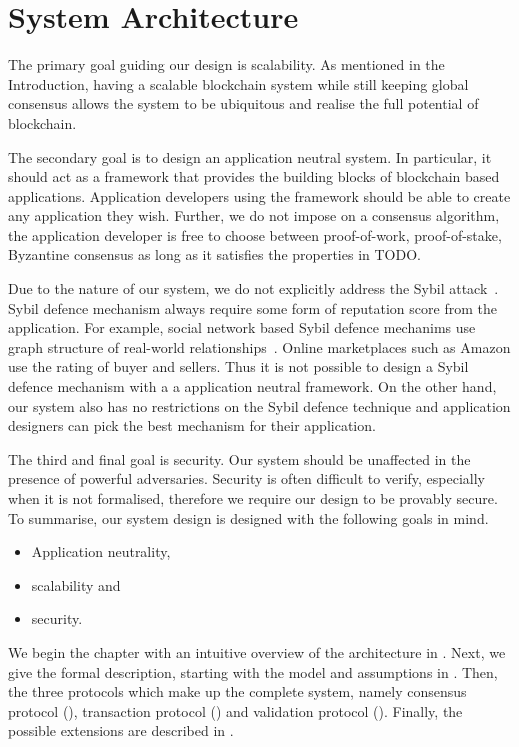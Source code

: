 \chapter{System Architecture}
\label{ch:model}

The primary goal guiding our design is scalability.
As mentioned in the Introduction, having a scalable blockchain system while still keeping global consensus
allows the system to be ubiquitous and realise the full potential of blockchain.

The secondary goal is to design an application neutral system.
In particular, it should act as a framework that provides the building blocks of blockchain based applications.
Application developers using the framework should be able to create any application they wish.
Further, we do not impose on a consensus algorithm,
the application developer is free to choose between proof-of-work, proof-of-stake,
Byzantine consensus as long as it  satisfies the properties in TODO.

Due to the nature of our system, we do not explicitly address the Sybil attack~\cite{douceur2002sybil}.
Sybil defence mechanism always require some form of reputation score from the application.
For example, social network based Sybil defence mechanims use graph structure of real-world relationships~\cite{yu2006sybilguard}.
Online marketplaces such as Amazon use the rating of buyer and sellers.
Thus it is not possible to design a Sybil defence mechanism with a a application neutral framework.
On the other hand, our system also has no restrictions on the Sybil defence technique
and application designers can pick the best mechanism for their application.

The third and final goal is security.
Our system should be unaffected in the presence of powerful adversaries.
Security is often difficult to verify, especially when it is not formalised, therefore we require our design to be provably secure.
To summarise, our system design is designed with the following goals in mind.
\begin{itemize}
    \item Application neutrality,
    \item scalability and
    \item security.
\end{itemize}

We begin the chapter with an intuitive overview of the architecture in .
Next, we give the formal description, starting with the model and assumptions in .
Then, the three protocols which make up the complete system,
namely consensus protocol (), transaction protocol () and validation protocol ().
Finally, the possible extensions are described in .


